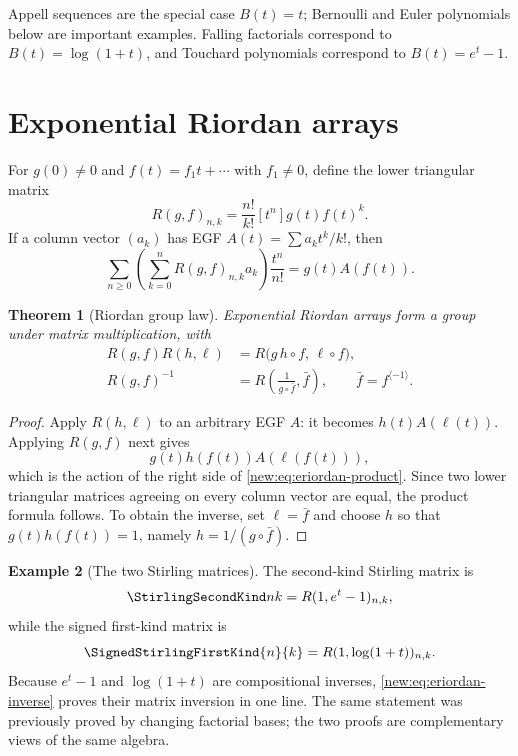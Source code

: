 \documentclass[11pt,a4paper,oneside,openany]{book}
\newtheorem{theorem}{Theorem}[chapter]
\theoremstyle{definition}
\newtheorem{example}[theorem]{Example}
\theoremstyle{remark}
\begin{document}
Appell sequences are the special case $B(t)=t$; Bernoulli and Euler
polynomials below are important examples.  Falling factorials correspond to
$B(t)=\log(1+t)$, and Touchard polynomials correspond to $B(t)=e^t-1$.

\section{Exponential Riordan arrays}

For $g(0)\ne0$ and $f(t)=f_1t+\cdots$ with $f_1\ne0$, define the lower
triangular matrix
\begin{equation}
 R(g,f)_{n,k}=\frac{n!}{k!}[t^n]g(t)f(t)^k.
 \label{new:eq:eriordan-entry}
\end{equation}
If a column vector $(a_k)$ has EGF $A(t)=\sum a_kt^k/k!$, then
\begin{equation}
 \sum_{n\ge0}\left(\sum_{k=0}^nR(g,f)_{n,k}a_k\right)\frac{t^n}{n!}
 =g(t)A(f(t)).
 \label{new:eq:eriordan-action}
\end{equation}

\begin{theorem}[Riordan group law]
Exponential Riordan arrays form a group under matrix multiplication, with
\begin{align}
 R(g,f)R(h,\ell)&=R\bigl(g\,h\!\circ f,\,\ell\!\circ f\bigr),
 \label{new:eq:eriordan-product}\\
 R(g,f)^{-1}&=R\left(\frac1{g\circ\bar f},\bar f\right),
 \qquad \bar f=f^{\langle-1\rangle}.
 \label{new:eq:eriordan-inverse}
\end{align}
\end{theorem}

\begin{proof}
Apply $R(h,\ell)$ to an arbitrary EGF $A$: it becomes $h(t)A(\ell(t))$.
Applying $R(g,f)$ next gives
\[
 g(t)h(f(t))A(\ell(f(t))),
\]
which is the action of the right side of
\eqref{new:eq:eriordan-product}.  Since two lower triangular matrices agreeing
on every column vector are equal, the product formula follows.  To obtain the
inverse, set $\ell=\bar f$ and choose $h$ so that $g(t)h(f(t))=1$, namely
$h=1/(g\circ\bar f)$.
\end{proof}

\begin{example}[The two Stirling matrices]
The second-kind Stirling matrix is
\[
 \StirlingSecondKind nk=R(1,e^t-1)_{n,k},
\]
while the signed first-kind matrix is
\[
 \SignedStirlingFirstKind{n}{k}=R(1,\log(1+t))_{n,k}.
\]
Because $e^t-1$ and $\log(1+t)$ are compositional inverses,
\eqref{new:eq:eriordan-inverse} proves their matrix inversion in one line.
The same statement was previously proved by changing factorial bases; the two
proofs are complementary views of the same algebra.
\end{example}
\end{document}
